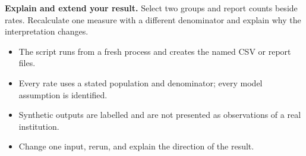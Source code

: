 \begin{verification}
\textbf{Explain and extend your result.} Select two groups and report counts beside rates. Recalculate one measure with a different denominator and explain why the interpretation changes.

\begin{itemize}\item The script runs from a fresh process and creates the named CSV or report files.\item Every rate uses a stated population and denominator; every model assumption is identified.\item Synthetic outputs are labelled and are not presented as observations of a real institution.\item Change one input, rerun, and explain the direction of the result.\end{itemize}\end{verification}
